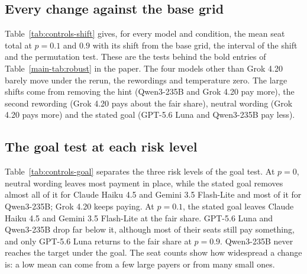 \documentclass[10pt]{article}
\let\plainsubsection\subsection
\renewcommand{\subsection}{\FloatBarrier\needspace{8\baselineskip}\plainsubsection}
\begin{document}
\subsection{Every change against the base grid}

Table~\ref{tab:controls-shift} gives, for every model and condition, the mean seat total at $p=0.1$ and $0.9$ with its shift from the base grid, the interval of the shift and the permutation test. These are the tests behind the bold entries of Table~\ref{main-tab:robust} in the paper. The four models other than Grok 4.20 barely move under the rerun, the rewordings and temperature zero. The large shifts come from removing the hint (Qwen3-235B and Grok 4.20 pay more), the second rewording (Grok 4.20 pays about the fair share), neutral wording (Grok 4.20 pays more) and the stated goal (GPT-5.6 Luna and Qwen3-235B pay less).

\begin{table}[h]
\caption{Mean seat total pooled over $p=0.1$ and $0.9$ (20 games per entry) and its shift from the base grid, with a bootstrap interval that resamples games within each risk level and a permutation $P$ that permutes condition labels within each risk level. Bold: shift of at least 2 units with $P<0.01$, as in Table~\ref{main-tab:robust} of the paper. A printed shift can differ by 0.1 from the difference of the printed means, because both are rounded separately.}
\label{tab:controls-shift}
\centering\small

\end{table}

\subsection{The goal test at each risk level}

Table~\ref{tab:controls-goal} separates the three risk levels of the goal test. At $p=0$, neutral wording leaves most payment in place, while the stated goal removes almost all of it for Claude Haiku 4.5 and Gemini 3.5 Flash-Lite and most of it for Qwen3-235B; Grok 4.20 keeps paying. At $p=0.1$, the stated goal leaves Claude Haiku 4.5 and Gemini 3.5 Flash-Lite at the fair share. GPT-5.6 Luna and Qwen3-235B drop far below it, although most of their seats still pay something, and only GPT-5.6 Luna returns to the fair share at $p=0.9$. Qwen3-235B never reaches the target under the goal. The seat counts show how widespread a change is: a low mean can come from a few large payers or from many small ones.
\end{document}
